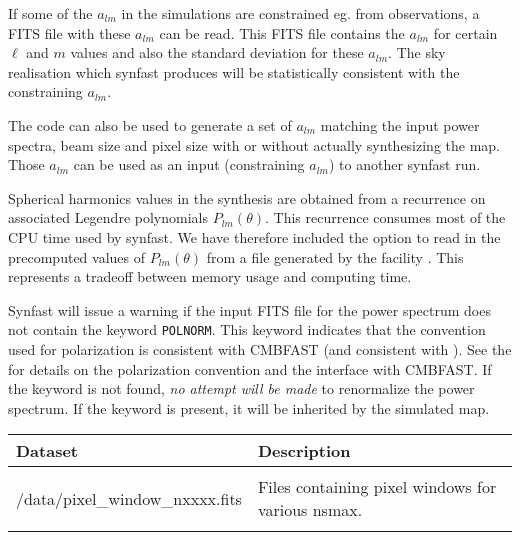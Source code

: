 \begin{codedescription}
{If some of the $a_{lm}$ in the simulations are constrained eg. from observations, a FITS file
with these $a_{lm}$ can be read. This FITS file contains 
the $a_{lm}$ for certain $\ell$ and $m$ values
and also the standard deviation for these $a_{lm}$. The sky
realisation which synfast produces will be statistically consistent
with the constraining $a_{lm}$.

The code can also be used
to generate a set of $a_{lm}$ matching the input power spectra, beam size and
pixel size with or without actually synthesizing the map. Those $a_{lm}$ can be
used as an input (constraining $a_{lm}$) to another synfast run.
\\
}
\end{codedescription}
%
\begin{cd_contd}
{
Spherical harmonics values in the synthesis are obtained from a
recurrence on associated Legendre polynomials $P_{lm}(\theta)$. 
This recurrence consumes most of the CPU time used by synfast. 
We have therefore included the option to read in the  precomputed values 
of 
$P_{lm}(\theta)$ from a file generated by the \healpix facility
.
This represents a tradeoff between memory usage and computing time.

Synfast will issue a warning if the input FITS file for the power spectrum does
not contain the keyword {\tt POLNORM}. This keyword indicates that the convention
used for polarization is consistent with CMBFAST (and consistent with ). See the 
for details on the
polarization convention and the interface with CMBFAST. If the
keyword is not found, {\em no attempt will be made} to renormalize the power
spectrum. 
If the keyword is present, it will be inherited by the simulated map.
}
\end{cd_contd}


\begin{datasets}
{
\begin{tabular}{p{0.3\hsize} p{0.35\hsize}} \hline  
  \textbf{Dataset} & \textbf{Description} \\ \hline
                   &                      \\ %
  /data/pixel\_window\_nxxxx.fits & Files containing pixel windows for
                   various nsmax.\\ 
                   &                      \\ \hline %
\end{tabular}
} 
\end{datasets}

